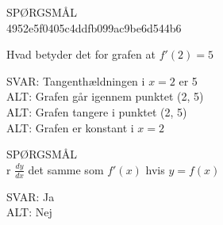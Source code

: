 \documentclass[]{article}
\newenvironment{question}[2]{SPØRGSMÅL\\}{\hspace{50px}}
\newcommand{\answer}[1]{{\color{green} SVAR: #1}\\}
\newcommand{\alt}[1]{{\color{red} ALT: #1}\\}
\begin{document}
	\begin{question}{multi}\id{4952e5f0405c4ddfb099ac9be6d544b6}
		
		Hvad betyder det for grafen at $f'(2)=5$
		
		\answer{Tangenthældningen i $x=2$ er 5}
		\alt{Grafen går igennem punktet (2, 5)}
		\alt{Grafen tangere i punktet (2, 5)}
		\alt{Grafen er konstant i $x=2$}
		
	\end{question}

    \begin{question}{multi}
		
		Er $\frac{dy}{dx}$ det samme som $f'(x)$ hvis $y=f(x)$
		
		\answer{Ja}
		\alt{Nej}
		
	\end{question}
\end{document}

